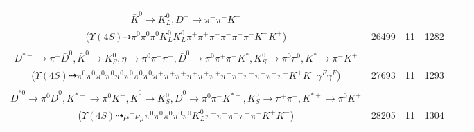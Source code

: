 \documentclass[landscape]{article}
\newcounter{rownumbers}
\newcommand\rn{\stepcounter{rownumbers}\arabic{rownumbers}}
\newcommand{\EOLP}{\\ \hline} %
\newcommand{\topoTags}[1]{#1} %
\begin{document}
\begin{longtable}{clcccc}
\rn & \makecell[l]{ $ 
\Upsilon(4S) \rightarrow B^{0} B^{0} ,
B^{0} \rightarrow \pi^{+} \pi^{-} K^{*} ,
B^{0} \rightarrow \pi^{+} \eta K^{0} \bar{K}^{0} D^{-} ,
K^{*} \rightarrow \pi^{-} K^{+} ,
\eta \rightarrow \pi^{0} \pi^{0} \pi^{0} ,
K^{0} \rightarrow K_{L}^{0} ,
$ \\ $
\bar{K}^{0} \rightarrow K_{L}^{0} ,
D^{-} \rightarrow \pi^{-} \pi^{-} K^{+} 
$ \\ ($
\Upsilon(4S) \dashrightarrow \pi^{0} \pi^{0} \pi^{0} K_{L}^{0} K_{L}^{0} \pi^{+} \pi^{+} \pi^{-} \pi^{-} \pi^{-} \pi^{-} K^{+} K^{+} 
$) } & \topoTags{26499 & }11 & 1282 \EOLP

\rn & \makecell[l]{ $ 
\Upsilon(4S) \rightarrow \bar{B}^{0} \bar{B}^{0} ,
\bar{B}^{0} \rightarrow \pi^{0} \pi^{+} K^{-} \gamma^{F} ,
\bar{B}^{0} \rightarrow \pi^{+} \pi^{+} \eta K^{*-} \eta^{\prime} D^{*-} ,
\eta \rightarrow \pi^{0} \pi^{+} \pi^{-} \gamma^{F} ,
K^{*-} \rightarrow \pi^{-} \bar{K}^{0} ,
\eta^{\prime} \rightarrow \pi^{0} \pi^{0} \eta ,
$ \\ $
D^{*-} \rightarrow \pi^{-} \bar{D}^{0} ,
\bar{K}^{0} \rightarrow K_{S}^{0} ,
\eta \rightarrow \pi^{0} \pi^{+} \pi^{-} ,
\bar{D}^{0} \rightarrow \pi^{0} \pi^{+} \pi^{-} K^{*} ,
K_{S}^{0} \rightarrow \pi^{0} \pi^{0} ,
K^{*} \rightarrow \pi^{-} K^{+} 
$ \\ ($
\Upsilon(4S) \dashrightarrow \pi^{0} \pi^{0} \pi^{0} \pi^{0} \pi^{0} \pi^{0} \pi^{0} \pi^{0} \pi^{+} \pi^{+} \pi^{+} \pi^{+} \pi^{+} \pi^{+} \pi^{-} \pi^{-} \pi^{-} \pi^{-} \pi^{-} \pi^{-} K^{+} K^{-} \gamma^{F} \gamma^{F} 
$) } & \topoTags{27693 & }11 & 1293 \EOLP

\rn & \makecell[l]{ $ 
\Upsilon(4S) \rightarrow \bar{B}^{0} \bar{B}^{0} ,
\bar{B}^{0} \rightarrow \pi^{+} K^{*}(1410)^{-} ,
\bar{B}^{0} \rightarrow \pi^{-} \bar{K}^{0} D^{+} \bar{D}^{*0} ,
K^{*}(1410)^{-} \rightarrow \pi^{0} K^{*-} ,
\bar{K}^{0} \rightarrow K_{L}^{0} ,
D^{+} \rightarrow \mu^{+} \nu_{\mu} \bar{K}^{0} ,
$ \\ $
\bar{D}^{*0} \rightarrow \pi^{0} \bar{D}^{0} ,
K^{*-} \rightarrow \pi^{0} K^{-} ,
\bar{K}^{0} \rightarrow K_{S}^{0} ,
\bar{D}^{0} \rightarrow \pi^{0} \pi^{-} K^{*+} ,
K_{S}^{0} \rightarrow \pi^{+} \pi^{-} ,
K^{*+} \rightarrow \pi^{0} K^{+} 
$ \\ ($
\Upsilon(4S) \dashrightarrow \mu^{+} \nu_{\mu} \pi^{0} \pi^{0} \pi^{0} \pi^{0} \pi^{0} K_{L}^{0} \pi^{+} \pi^{+} \pi^{-} \pi^{-} \pi^{-} K^{+} K^{-} 
$) } & \topoTags{28205 & }11 & 1304 \EOLP


\end{longtable}
\end{document}
